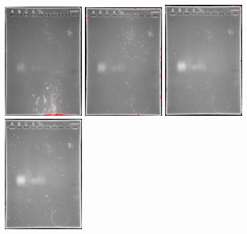 \documentclass[letterpaper]{article}
\begin{document}
\begin{figure}
\begin{center}

\includegraphics[width=0.3\textwidth]{./gels/view1-stain15min-faintbands-small.png}
\includegraphics[width=0.3\textwidth]{./gels/view2-stain25min-faintbands-small.png}
\includegraphics[width=0.3\textwidth]{./gels/view3-stain35min-faintbands-small.png}
\includegraphics[width=0.3\textwidth]{./gels/view4-stain35min-2secexposure-small.png}

\end{center}
\end{figure}
\end{document}
